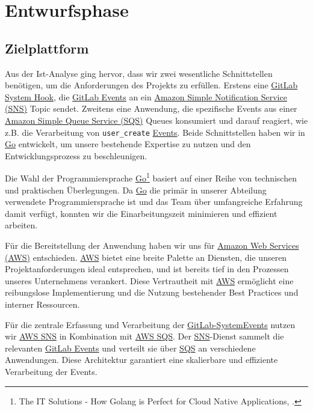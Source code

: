 \section{Entwurfsphase} 
\label{sec:Entwurfsphase}

\subsection{Zielplattform}
\label{sec:Zielplattform}

Aus der Ist-Analyse ging hervor, dass wir zwei wesentliche Schnittstellen benötigen, um die Anforderungen des Projekts zu erfüllen. Erstens eine \hyperlink{GitLabSystemhooks}{\textcolor{AOBlau}{GitLab System Hook}}, die \hyperlink{GitLabEvent}{\textcolor{AOBlau}{GitLab Events}} an ein \hyperlink{SNS}{\textcolor{AOBlau}{Amazon Simple Notification Service (SNS)}} Topic sendet. Zweitens eine Anwendung, die spezifische Events aus einer \hyperlink{SQS}{\textcolor{AOBlau}{Amazon Simple Queue Service (SQS)}} Queues konsumiert und darauf reagiert, wie z.B. die Verarbeitung von \texttt{user\_create} \hyperlink{GitLabEvent}{\textcolor{AOBlau}{Events}}. Beide Schnittstellen haben wir in \hyperlink{Go}{\textcolor{AOBlau}{Go}} entwickelt, um unsere bestehende Expertise zu nutzen und den Entwicklungsprozess zu beschleunigen.

Die Wahl der Programmiersprache \hyperlink{Go}{\textcolor{AOBlau}{Go}}\footnote{The IT Solutions - How Golang is Perfect for Cloud Native Applications, \cite{Go}.} basiert auf einer Reihe von technischen und praktischen Überlegungen. Da \hyperlink{Go}{\textcolor{AOBlau}{Go}} die primär in unserer Abteilung verwendete Programmiersprache ist und das Team über umfangreiche Erfahrung damit verfügt, konnten wir die Einarbeitungszeit minimieren und effizient arbeiten.

Für die Bereitstellung der Anwendung haben wir uns für \hyperlink{AWS}{\textcolor{AOBlau}{Amazon Web Services (AWS)}} entschieden. \hyperlink{AWS}{\textcolor{AOBlau}{AWS}} bietet eine breite Palette an Diensten, die unseren Projektanforderungen ideal entsprechen, und ist bereits tief in den Prozessen unseres Unternehmens verankert. Diese Vertrautheit mit \hyperlink{AWS}{\textcolor{AOBlau}{AWS}} ermöglicht eine reibungslose Implementierung und die Nutzung bestehender Best Practices und interner Ressourcen.

Für die zentrale Erfassung und Verarbeitung der \hyperlink{GitLabEvent}{\textcolor{AOBlau}{GitLab-SystemEvents}} nutzen wir \hyperlink{SNS}{\textcolor{AOBlau}{AWS SNS}} in Kombination mit \hyperlink{SQS}{\textcolor{AOBlau}{AWS SQS}}. Der \hyperlink{SNS}{\textcolor{AOBlau}{SNS}}-Dienst sammelt die relevanten \hyperlink{GitLabEvent}{\textcolor{AOBlau}{GitLab Events}} und verteilt sie über \hyperlink{SQS}{\textcolor{AOBlau}{SQS}} an verschiedene Anwendungen. Diese Architektur garantiert eine skalierbare und effiziente Verarbeitung der Events.


